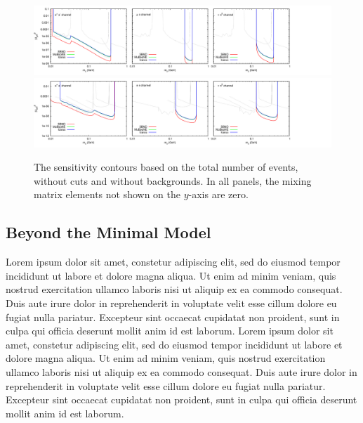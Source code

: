 \documentclass[11pt, a4paper]{article}
\newcommand{\lorem}{ \textcolor[rgb]{0.8,0.8,0.8}{Lorem ipsum dolor sit amet, constetur
adipiscing elit, sed do eiusmod tempor incididunt ut labore et dolore magna
aliqua. Ut enim ad minim veniam, quis nostrud exercitation ullamco laboris nisi
ut aliquip ex ea commodo consequat. Duis aute irure dolor in reprehenderit in
voluptate velit esse cillum dolore eu fugiat nulla pariatur. Excepteur sint
occaecat cupidatat non proident, sunt in culpa qui officia deserunt mollit anim
id est laborum.}}
\begin{document}
\begin{figure}[t]
\center
\includegraphics[width=1.0\textwidth,clip,trim=0 20 300 15]{figures/zerobg_um4_all_panels.pdf}
\includegraphics[width=1.0\textwidth,clip,trim=0 20 300 15]{figures/zerobg_ue4_all_panels.pdf}

\caption{\label{fig:no_cuts_no_bkg}The sensitivity contours based on the total number of events, without cuts and without backgrounds. In all panels, the mixing matrix elements not shown on the $y$-axis are zero.}

\end{figure}


\subsection{\label{sec:BMM}Beyond the Minimal Model}

\lorem\lorem


\end{document}
